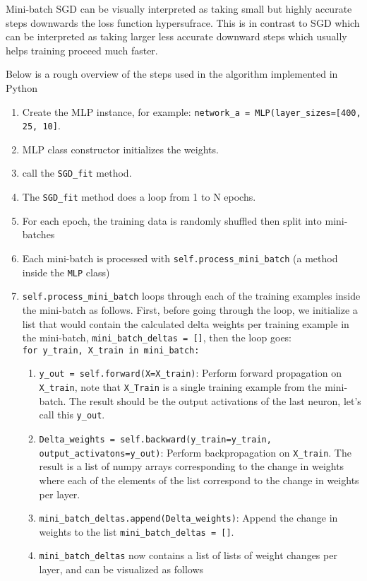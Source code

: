 \documentclass{article} %
\theoremstyle{definition}
\theoremstyle{remark}
\theoremstyle{plain}
\begin{document}
Mini-batch SGD can be visually interpreted as taking small but highly accurate steps downwards the loss function hypersufrace. This is in contrast to SGD which can be interpreted as taking larger less accurate downward steps which usually helps training proceed much faster.

Below is a rough overview of the steps used in the algorithm implemented in Python

\begin{enumerate}
    \item Create the MLP instance, for example: \verb|network_a = MLP(layer_sizes=[400, 25, 10]|.
    \item MLP class constructor initializes the weights.
    \item call the \verb|SGD_fit| method.
    \item The \verb|SGD_fit| method does a loop from 1 to N epochs.
    \item For each epoch, the training data is randomly shuffled then split into mini-batches
    \item Each mini-batch is processed with \verb|self.process_mini_batch| (a method inside the \verb|MLP| class)
    \item \verb|self.process_mini_batch| loops through each of the training examples inside the mini-batch as follows. First, before going through the loop, we initialize a list that would contain the calculated delta weights per training example in the mini-batch, \verb|mini_batch_deltas = []|, then the loop goes: \\
    \verb|for y_train, X_train in mini_batch:|
    \begin{enumerate}
        \item \verb|y_out = self.forward(X=X_train)|: Perform forward propagation on \verb|X_train|, note that \verb|X_Train| is a single training example from the mini-batch. The result should be the output activations of the last neuron, let's call this \verb|y_out|.
        \item \verb|Delta_weights = self.backward(y_train=y_train, output_activatons=y_out)|: Perform backpropagation on \verb|X_train|. The result is a list of numpy arrays corresponding to the change in weights where each of the elements of the list correspond to the change in weights per layer.
        \item \verb|mini_batch_deltas.append(Delta_weights)|: Append the change in weights to the list \verb|mini_batch_deltas = []|.
        \item \verb|mini_batch_deltas| now contains a list of lists of weight changes per layer, and can be visualized as follows

\end{enumerate}
\end{enumerate}
\end{document}
